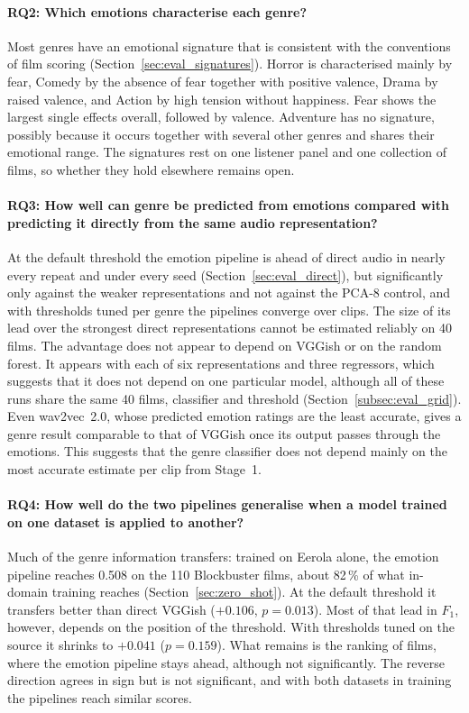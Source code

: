 \paragraph{RQ2: Which emotions characterise each genre?} Most genres have an emotional signature that is consistent with the conventions of film
scoring (Section~\ref{sec:eval_signatures}). Horror is characterised mainly by fear, Comedy by the
absence of fear together with positive valence, Drama by raised valence, and Action by high
tension without happiness. Fear shows the largest single effects overall, followed by valence. Adventure has no signature, possibly because it occurs together with several other genres
and shares their emotional range. The signatures rest on one listener panel and one collection of films, so whether they hold elsewhere remains open.

\paragraph{RQ3: How well can genre be predicted from emotions compared with predicting it
directly from the same audio representation?} At the default threshold the emotion pipeline is ahead of direct audio in nearly every repeat and under every seed (Section~\ref{sec:eval_direct}), but significantly only against the weaker representations and not against the PCA-8 control, and with thresholds tuned per genre the pipelines converge over clips. The size of its lead over the strongest direct representations cannot be estimated reliably on 40 films. The advantage does not appear to depend on
VGGish or on the random forest. It appears with each of six representations and three regressors, which suggests that it does not depend on one particular model, although all of these runs share the same 40 films, classifier and threshold (Section~\ref{subsec:eval_grid}). Even wav2vec~2.0, whose predicted emotion ratings are the least accurate, gives a genre result comparable to that of VGGish
once its output passes through the emotions. This suggests that the genre classifier does not
depend mainly on the most accurate estimate per clip from Stage~1.

\paragraph{RQ4: How well do the two pipelines generalise when a model trained on one dataset
is applied to another?} Much of the genre
information transfers: trained on Eerola alone, the emotion pipeline reaches 0.508 on the 110
Blockbuster films, about 82\,\% of what in-domain training reaches
(Section~\ref{sec:zero_shot}). At the default threshold it transfers better than direct
VGGish ($+0.106$, $p=0.013$). Most of that lead in $F_1$, however, depends on the position
of the threshold. With thresholds tuned on the source it shrinks to $+0.041$ ($p=0.159$). What
remains is the ranking of films, where the emotion pipeline stays ahead, although not
significantly. The reverse
direction agrees in sign but is not significant, and with both datasets in training the pipelines reach similar scores.

